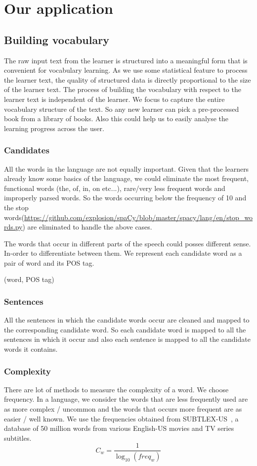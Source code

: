 \documentclass[11pt,a4paper]{article}
\begin{document}
\section{Our application}

\subsection{Building vocabulary}
The raw input text from the learner is structured into a meaningful form that is
convenient for vocabulary learning. As we use some statistical feature to
process the learner text, the quality of structured data is directly
proportional to the size of the learner text. The process of building the
vocabulary with respect to the learner text is independent of the learner. We focus
to capture the entire vocabulary structure of the text. So any new learner can
pick a pre-processed book from a library of books. Also this could help us to easily
analyse the learning progress across the user.

\subsubsection{Candidates}
All the words in the language are not equally important. Given that the learners
already know some basics of the language, we could eliminate the most frequent, 
functional words (the, of, in, on etc...), rare/very less frequent words and
improperly parsed words. So the words occurring below the frequency of 10 and
the stop words(\url{https://github.com/explosion/spaCy/blob/master/spacy/lang/en/stop_words.py}) are eliminated to handle the above cases. 

The words that occur in different parts of the speech could posses different sense.
In-order to differentiate between them. We represent each candidate word as a
pair of word and its POS tag.
\begin{center}(word, POS tag)\end{center}

\subsubsection{Sentences}
All the sentences in which the candidate words occur are cleaned and mapped to
the corresponding candidate word. So each candidate word is mapped to all the sentences
in which it occur and also each sentence is mapped to all the candidate
words it contains.

\subsubsection{Complexity}
There are lot of methods to measure the complexity of a word. We choose frequency.
In a language, we consider the words that are less frequently used are as
more complex / uncommon and the words that occurs more frequent are as easier / well known.
We use the frequencies obtained from SUBTLEX-US~\citet{brysbaert2009moving}, a database of 50 million
words from various English-US movies and TV series subtitles.
\begin{equation}
  C_w = \frac{1}{\log_{10}(freq_w)}
\end{equation}
\end{document}
